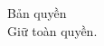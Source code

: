 \thispagestyle{empty}
\vspace*{\fill}
\noindent
Bản quyền \textcopyright{} \the\year{} \thebookauthor \\[2mm]
Giữ toàn quyền.
\clearpage
